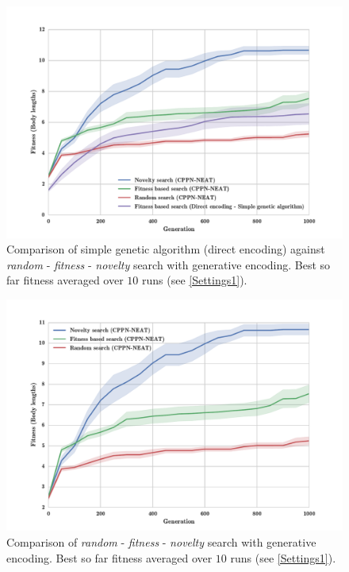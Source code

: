 \begin{figure}
\centering
\includegraphics[width=1.0\textwidth]{../Figures/Results/FitNovRandomDirectSize5.pdf}
\caption{Comparison of simple genetic algorithm (direct encoding) against \emph{random} - \emph{fitness} - \emph{novelty} search with generative encoding. Best so far fitness averaged over $10$ runs (see \ref{Settings1}).}
\label{fig:FitNovRandomDirectSize5}
\end{figure}

\begin{figure}
\centering
\includegraphics[width=1.0\textwidth]{../Figures/Results/FitNovRandomSize5.pdf}
\caption{Comparison of \emph{random} - \emph{fitness} - \emph{novelty} search with generative encoding. Best so far fitness averaged over $10$ runs (see \ref{Settings1}).}
\label{fig:FitNovRandomSize5}
\end{figure}


